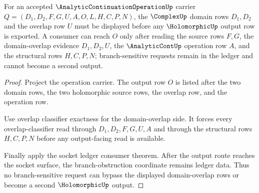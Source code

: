 \begin{theorem}
\label{thm:analytic-continuation-operation-domain-overlap-boundary}
For an accepted $\AnalyticContinuationOperationUp$ carrier $Q=(D_1,D_2,F,G,U,A,O,L,H,C,P,N)$, the $\ComplexUp$ domain rows $D_1,D_2$ and the overlap row $U$ must be displayed before any $\HolomorphicUp$ output row is exported. A consumer can reach $O$ only after reading the source rows $F,G$, the domain-overlap evidence $D_1,D_2,U$, the $\AnalyticContUp$ operation row $A$, and the structural rows $H,C,P,N$; branch-sensitive requests remain in the ledger and cannot become a second output.
\end{theorem}
\begin{proof}
Project the operation carrier. The output row $O$ is listed after the two domain rows, the two holomorphic source rows, the overlap row, and the operation row.

Use overlap classifier exactness for the domain-overlap side. It forces every overlap-classifier read through $D_1,D_2,F,G,U,A$ and through the structural rows $H,C,P,N$ before any output-facing read is available.

Finally apply the socket ledger consumer theorem. After the output route reaches the socket surface, the branch-obstruction coordinate remains ledger data. Thus no branch-sensitive request can bypass the displayed domain-overlap rows or become a second $\HolomorphicUp$ output.
\end{proof}

